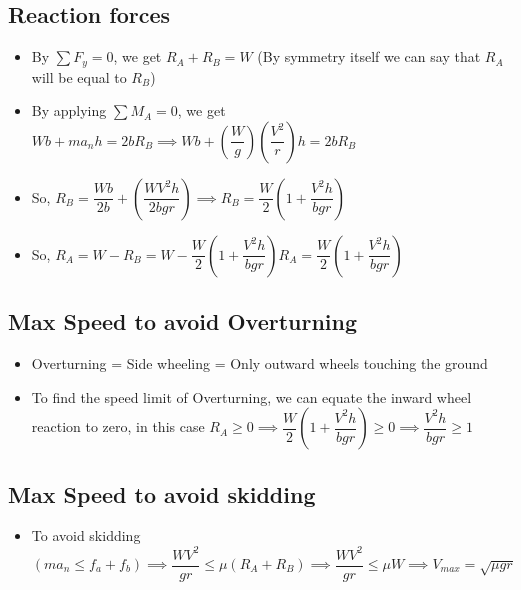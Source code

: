 \documentclass[8pt]{report}
\begin{document}
	\subsection{Reaction forces}
		\begin{itemize}
			\item By $\sum F_y=0$, we get $R_A + R_B = W$ (By symmetry itself we can say that $R_A$ will be equal to $R_B$)
			\item By applying $\sum M_A=0$, we get $Wb+ma_nh=2bR_B \implies Wb+\left(\dfrac{W}{g}\right)\left(\dfrac{V^2}{r}\right)h=2bR_B$
			\item So, $R_B=\dfrac{Wb}{2b}+\left(\dfrac{WV^2h}{2bgr}\right) \implies \boxed{R_B=\dfrac{W}{2}\left(1+\dfrac{V^2h}{bgr}\right)}$
			\item So, $R_A = W-R_B = W-\dfrac{W}{2}\left(1+\dfrac{V^2h}{bgr}\right) \boxed{R_A=\dfrac{W}{2}\left(1+\dfrac{V^2h}{bgr}\right)} $
		\end{itemize}
	\subsection{Max Speed to avoid Overturning}
		\begin{itemize}
			\item Overturning = Side wheeling = Only outward wheels touching the ground
			\item To find the speed limit of Overturning, we can equate the inward wheel reaction to zero, in this case $R_A\geq 0 \implies \dfrac{W}{2}\left(1+\dfrac{V^2h}{bgr}\right)\geq 0 \implies \boxed{ \dfrac{V^2h}{bgr}\geq 1}$
		\end{itemize}
	\subsection{Max Speed to avoid skidding}
		\begin{itemize}
			\item To avoid skidding $\left(ma_n\le f_a + f_b\right) \implies \dfrac{WV^2}{gr}\le\mu(R_A+R_B) \implies \dfrac{WV^2}{gr}\le \mu W \implies \boxed{V_{max} = \sqrt{\mu gr}}$
		\end{itemize}\hrulefill
\end{document}
